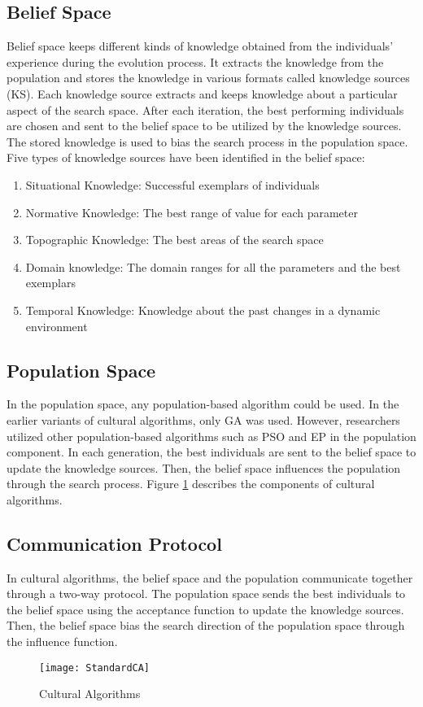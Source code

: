 \subsection{Belief Space}
Belief space keeps different kinds of knowledge obtained from the individuals' experience during the evolution process. It extracts the knowledge from the population and stores the knowledge in various formats called knowledge sources (KS). Each knowledge source extracts and keeps knowledge about a particular aspect of the search space. 
\newline
After each iteration, the best performing individuals are chosen and sent to the belief space to be utilized by the knowledge sources. The stored knowledge is used to bias the search process in the population space. Five types of knowledge sources have been identified in the belief space:
\begin{enumerate}
	\item Situational Knowledge: Successful exemplars of individuals
	\item Normative Knowledge: The best range of value for each parameter
	\item Topographic Knowledge: The best areas of the search space
	\item Domain knowledge: The domain ranges for all the parameters and the best exemplars
	\item Temporal Knowledge: Knowledge about the past changes in a dynamic environment
\end{enumerate}
\subsection{Population Space}
In the population space, any population-based algorithm could be used. In the earlier variants of cultural algorithms, only GA was used. However, researchers utilized other population-based algorithms such as PSO and EP in the population component. In each generation, the best individuals are sent to the belief space to update the knowledge sources. Then, the belief space influences the population through the search process. Figure \ref{fig:StandardCA} describes the components of cultural algorithms.
\subsection{Communication Protocol}
In cultural algorithms, the belief space and the population communicate together through a two-way protocol. The population space sends the best individuals to the belief space using the acceptance function to update the knowledge sources. Then, the belief space bias the search direction of the population space through the influence function.
\begin{figure}[h]
	\texttt{[image: StandardCA]}
	\centering
	\caption{Cultural Algorithms \citet{kobti2013heterogeneous}}
	\label{fig:StandardCA}
\end{figure}
